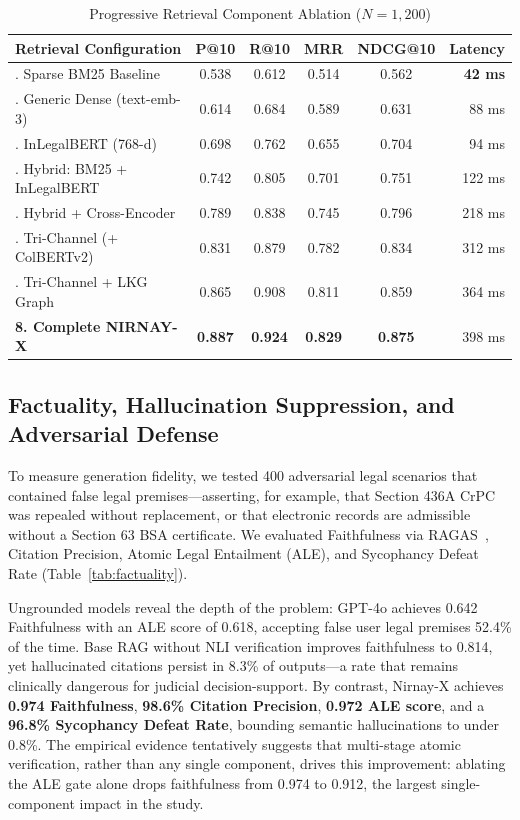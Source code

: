 \documentclass[conference]{IEEEtran}
\begin{document}
\begin{table}[!t]
\caption{Progressive Retrieval Component Ablation ($N=1,200$)}
\label{tab:retrieval_ablation}
\centering
\footnotesize
\setlength{\tabcolsep}{2pt}
\begin{tabularx}{\columnwidth}{>{\raggedright\arraybackslash}Xccccr}
\toprule
\textbf{Retrieval Configuration} & \textbf{P@10} & \textbf{R@10} & \textbf{MRR} & \textbf{NDCG@10} & \textbf{Latency} \\
\midrule
1. Sparse BM25 Baseline & 0.538 & 0.612 & 0.514 & 0.562 & \textbf{42 ms} \\
2. Generic Dense (text-emb-3) & 0.614 & 0.684 & 0.589 & 0.631 & 88 ms \\
3. InLegalBERT (768-d) & 0.698 & 0.762 & 0.655 & 0.704 & 94 ms \\
4. Hybrid: BM25 + InLegalBERT & 0.742 & 0.805 & 0.701 & 0.751 & 122 ms \\
5. Hybrid + Cross-Encoder & 0.789 & 0.838 & 0.745 & 0.796 & 218 ms \\
6. Tri-Channel (+ ColBERTv2) & 0.831 & 0.879 & 0.782 & 0.834 & 312 ms \\
7. Tri-Channel + LKG Graph & 0.865 & 0.908 & 0.811 & 0.859 & 364 ms \\
\midrule
\textbf{8. Complete NIRNAY-X} & \textbf{0.887} & \textbf{0.924} & \textbf{0.829} & \textbf{0.875} & 398 ms \\
\bottomrule
\end{tabularx}
\end{table}

\subsection{Factuality, Hallucination Suppression, and Adversarial Defense}
To measure generation fidelity, we tested 400 adversarial legal scenarios that contained false legal premises---asserting, for example, that Section 436A CrPC was repealed without replacement, or that electronic records are admissible without a Section 63 BSA certificate. We evaluated Faithfulness via RAGAS~\cite{es2024ragas}, Citation Precision, Atomic Legal Entailment (ALE), and Sycophancy Defeat Rate (Table~\ref{tab:factuality}).

Ungrounded models reveal the depth of the problem: GPT-4o achieves 0.642 Faithfulness with an ALE score of 0.618, accepting false user legal premises 52.4\% of the time. Base RAG without NLI verification improves faithfulness to 0.814, yet hallucinated citations persist in 8.3\% of outputs---a rate that remains clinically dangerous for judicial decision-support. By contrast, Nirnay-X achieves \textbf{0.974 Faithfulness}, \textbf{98.6\% Citation Precision}, \textbf{0.972 ALE score}, and a \textbf{96.8\% Sycophancy Defeat Rate}, bounding semantic hallucinations to under 0.8\%. The empirical evidence tentatively suggests that multi-stage atomic verification, rather than any single component, drives this improvement: ablating the ALE gate alone drops faithfulness from 0.974 to 0.912, the largest single-component impact in the study.
\end{document}
